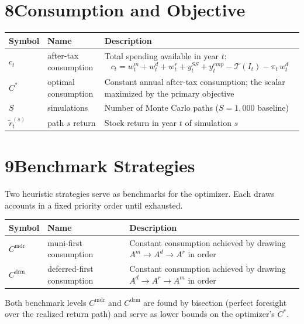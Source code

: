 \documentclass[12pt]{article}
\begin{document}
\section*{8\quad Consumption and Objective}

\begin{tabular}{@{} L{2.6cm} L{4.4cm} L{6.5cm} @{}}
\toprule
\textbf{Symbol} & \textbf{Name} & \textbf{Description} \\
\midrule
$c_t$ & after-tax consumption & Total spending available in year $t$:
\[
  c_t = w^m_t + w^d_t + w^r_t + y^{SS}_t + y^{emp}_t - \mathcal{T}(I_t) - \pi_t\,w^d_t
\] \\[3pt]
$C^*$ & optimal consumption & Constant annual after-tax consumption; the scalar
        maximized by the primary objective \\[3pt]
$S$ & simulations & Number of Monte Carlo paths ($S = 1{,}000$ baseline) \\[3pt]
$\tilde{r}^{(s)}_t$ & path $s$ return & Stock return in year $t$ of simulation $s$ \\
\bottomrule
\end{tabular}

\section*{9\quad Benchmark Strategies}

Two heuristic strategies serve as benchmarks for the optimizer.
Each draws accounts in a fixed priority order until exhausted.

\medskip
\begin{tabular}{@{} L{2.6cm} L{4.4cm} L{6.5cm} @{}}
\toprule
\textbf{Symbol} & \textbf{Name} & \textbf{Description} \\
\midrule
$C^{\mathrm{mdr}}$ & muni-first consumption & Constant consumption achieved by drawing
                    $A^m \to A^d \to A^r$ in order \\[3pt]
$C^{\mathrm{drm}}$ & deferred-first consumption & Constant consumption achieved by drawing
                    $A^d \to A^r \to A^m$ in order \\
\bottomrule
\end{tabular}

\medskip\noindent
Both benchmark levels $C^{\mathrm{mdr}}$ and $C^{\mathrm{drm}}$ are found by bisection
(perfect foresight over the realized return path) and serve as lower bounds on the
optimizer's $C^*$.
\end{document}
